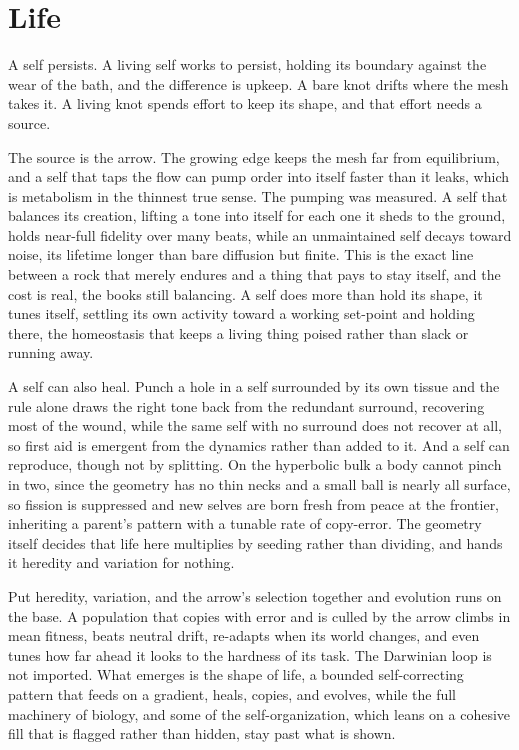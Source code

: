 \section{Life}

A self persists. A living self works to persist, holding its boundary against the wear of the bath, and the difference is upkeep. A bare knot drifts where the mesh takes it. A living knot spends effort to keep its shape, and that effort needs a source.

The source is the arrow. The growing edge keeps the mesh far from equilibrium, and a self that taps the flow can pump order into itself faster than it leaks, which is metabolism in the thinnest true sense. The pumping was measured. A self that balances its creation, lifting a tone into itself for each one it sheds to the ground, holds near-full fidelity over many beats, while an unmaintained self decays toward noise, its lifetime longer than bare diffusion but finite. This is the exact line between a rock that merely endures and a thing that pays to stay itself, and the cost is real, the books still balancing. A self does more than hold its shape, it tunes itself, settling its own activity toward a working set-point and holding there, the homeostasis that keeps a living thing poised rather than slack or running away.

A self can also heal. Punch a hole in a self surrounded by its own tissue and the rule alone draws the right tone back from the redundant surround, recovering most of the wound, while the same self with no surround does not recover at all, so first aid is emergent from the dynamics rather than added to it. And a self can reproduce, though not by splitting. On the hyperbolic bulk a body cannot pinch in two, since the geometry has no thin necks and a small ball is nearly all surface, so fission is suppressed and new selves are born fresh from peace at the frontier, inheriting a parent's pattern with a tunable rate of copy-error. The geometry itself decides that life here multiplies by seeding rather than dividing, and hands it heredity and variation for nothing.

Put heredity, variation, and the arrow's selection together and evolution runs on the base. A population that copies with error and is culled by the arrow climbs in mean fitness, beats neutral drift, re-adapts when its world changes, and even tunes how far ahead it looks to the hardness of its task. The Darwinian loop is not imported. What emerges is the shape of life, a bounded self-correcting pattern that feeds on a gradient, heals, copies, and evolves, while the full machinery of biology, and some of the self-organization, which leans on a cohesive fill that is flagged rather than hidden, stay past what is shown.
